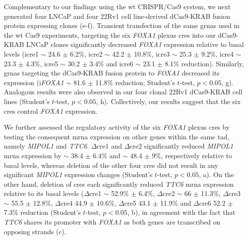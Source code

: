 Complementary to our findings using the \gls{wt} CRISPR/Cas9 system, we next generated four LNCaP and four 22Rv1 cell line-derived dCas9-KRAB fusion protein expressing clones (e-f).
Transient transfection of the same \glspl{grna} used in the \gls{wt} Cas9 experiments, targeting the six \emph{FOXA1} plexus \glspl{cre} into our dCas9-KRAB LNCaP clones significantly decreased \emph{FOXA1} expression relative to basal levels (i\gls{cre}1 $\sim$ 24.6 $\pm$ 6.2\%, i\gls{cre}2 $\sim$ 42.2 $\pm$ 10.8\%, i\gls{cre}3 $\sim$ 25.3 $\pm$ 9.2\%, i\gls{cre}4 $\sim$ 23.3 $\pm$ 4.3\%, i\gls{cre}5 $\sim$ 30.2 $\pm$ 3.4\% and i\gls{cre}6 $\sim$ 23.1 $\pm$ 8.1\% reduction).
Similarly, \glspl{grna} targeting the dCas9-KRAB fusion protein to \emph{FOXA1} decreased its expression (i\emph{FOXA1} $\sim$ 81.6 $\pm$ 11.8\% reduction; Student's $t$-test, $p<0.05$, g).
Analogous results were also observed in our four clonal 22Rv1 dCas9-KRAB cell lines (Student's $t$-test, $p<0.05$, h).
Collectively, our results suggest that the six \glspl{cre} control \emph{FOXA1} expression.

We further assessed the regulatory activity of the six \emph{FOXA1} plexus \glspl{cre} by testing the consequent \gls{mrna} expression on other genes within the same \gls{tad}, namely \emph{MIPOL1} and \emph{TTC6}.
$\Delta$\gls{cre}1 and $\Delta$\gls{cre}2 significantly reduced \emph{MIPOL1} \gls{mrna} expression by $\sim$ 38.4 $\pm$ 6.4\% and $\sim$ 48.4 $\pm$ 9\%, respectively relative to basal levels, whereas deletion of the other four \glspl{cre} did not result in any significant \emph{MIPOL1} expression changes (Student's $t$-test, $p<0.05$, a).
On the other hand, deletion of \glspl{cre} each significantly reduced \emph{TTC6} \gls{mrna} expression relative to its basal levels ($\Delta$\gls{cre}1 $\sim$ 52.9\% $\pm$ 6.4\%, $\Delta$\gls{cre}2 $\sim$ 66 $\pm$ 11.3\%, $\Delta$\gls{cre}3 $\sim$ 55.5 $\pm$ 12.8\%, $\Delta$\gls{cre}4 44.9 $\pm$ 10.6\%, $\Delta$\gls{cre}5 43.1 $\pm$ 11.9\% and $\Delta$\gls{cre}6 52.2 $\pm$ 7.3\% reduction (Student's $t$-test, $p<0.05$, b), in agreement with the fact that \emph{TTC6} shares its promoter with \emph{FOXA1} as both genes are transcribed on opposing strands (c).

